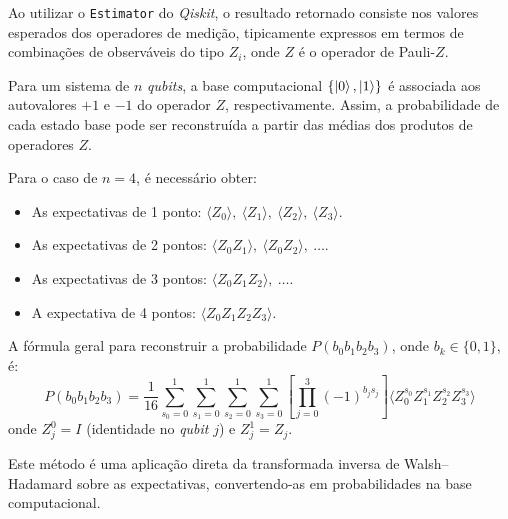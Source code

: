 \label{ap:apendiceB}

Ao utilizar o \texttt{Estimator} do \textit{Qiskit}, o resultado retornado consiste nos valores esperados dos operadores de medição, tipicamente expressos em termos de combinações de observáveis do tipo $Z_i$, onde $Z$ é o operador de Pauli-$Z$. 

Para um sistema de $n$ \textit{qubits}, a base computacional $\{\ket{0}, \ket{1}\}$ é associada aos autovalores $+1$ e $-1$ do operador $Z$, respectivamente. Assim, a probabilidade de cada estado base pode ser reconstruída a partir das médias dos produtos de operadores $Z$.

Para o caso de $n=4$, é necessário obter:
\begin{itemize}
    \item As expectativas de 1 ponto: $\langle Z_0 \rangle, ~\langle Z_1 \rangle,~ \langle Z_2 \rangle,~ \langle Z_3 \rangle$.
    \item As expectativas de 2 pontos: $\langle Z_0 Z_1 \rangle,~ \langle Z_0 Z_2 \rangle,~ \dots$.
    \item As expectativas de 3 pontos: $\langle Z_0 Z_1 Z_2 \rangle,~ \dots$.
    \item A expectativa de 4 pontos: $\langle Z_0 Z_1 Z_2 Z_3 \rangle$.
\end{itemize}

A fórmula geral para reconstruir a probabilidade $P(b_0 b_1 b_2 b_3)$, onde $b_k \in \{0,1\}$, é:
\begin{equation}
P(b_0 b_1 b_2 b_3) = \frac{1}{16} \sum_{s_0=0}^1 \sum_{s_1=0}^1 \sum_{s_2=0}^1 \sum_{s_3=0}^1 
\left[ \prod_{j=0}^3 (-1)^{b_j s_j} \right] \langle Z_0^{s_0} Z_1^{s_1} Z_2^{s_2} Z_3^{s_3} \rangle
\end{equation}
onde $Z_j^0 = I$ (identidade no \textit{qubit} $j$) e $Z_j^1 = Z_j$.

Este método é uma aplicação direta da transformada inversa de Walsh–Hadamard sobre as expectativas, convertendo-as em probabilidades na base computacional.

